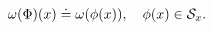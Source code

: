 \begin{equation} \label{extension}
\omega(\Phi)(x) \doteq  \omega (\phi (x)), \quad \phi (x) 
\in {\cal S}_x.
\end{equation}

